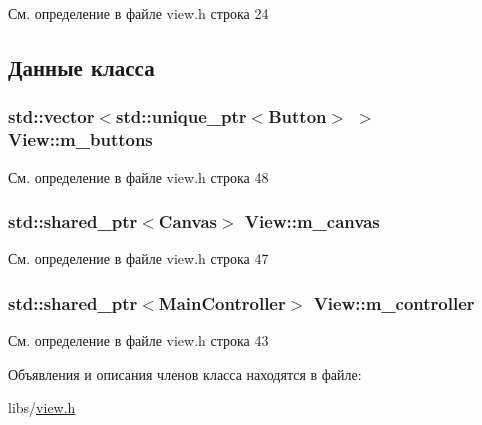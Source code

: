 См. определение в файле view.\-h строка 24



\subsection{Данные класса}
\hypertarget{class_view_a628fc37c28703cfe87c9e903a48709dc}{
\subsubsection[{m\-\_\-buttons}]{\setlength{\rightskip}{0pt plus 5cm}std\-::vector$<$std\-::unique\-\_\-ptr$<${\bf Button}$>$ $>$ View\-::m\-\_\-buttons\hspace{0.3cm}{\ttfamily [private]}}}\label{class_view_a628fc37c28703cfe87c9e903a48709dc}


См. определение в файле view.\-h строка 48

\hypertarget{class_view_a54ba1f3b0fa09cedb0267e1c95b12a6e}{
\subsubsection[{m\-\_\-canvas}]{\setlength{\rightskip}{0pt plus 5cm}std\-::shared\-\_\-ptr$<${\bf Canvas}$>$ View\-::m\-\_\-canvas\hspace{0.3cm}{\ttfamily [private]}}}\label{class_view_a54ba1f3b0fa09cedb0267e1c95b12a6e}


См. определение в файле view.\-h строка 47

\hypertarget{class_view_ade0c47df7c220ec738183dce973fcc2d}{
\subsubsection[{m\-\_\-controller}]{\setlength{\rightskip}{0pt plus 5cm}std\-::shared\-\_\-ptr$<${\bf Main\-Controller}$>$ View\-::m\-\_\-controller\hspace{0.3cm}{\ttfamily [private]}}}\label{class_view_ade0c47df7c220ec738183dce973fcc2d}


См. определение в файле view.\-h строка 43



Объявления и описания членов класса находятся в файле\-:\begin{DoxyCompactItemize}
\item 
libs/\hyperlink{view_8h}{view.\-h}\end{DoxyCompactItemize}
